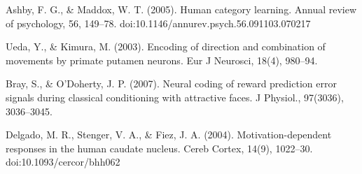 Ashby, F. G., & Maddox, W. T. (2005). Human category learning. Annual review of psychology, 56, 149–78. doi:10.1146/annurev.psych.56.091103.070217

Ueda, Y., & Kimura, M. (2003). Encoding of direction and combination of movements by primate putamen neurons. Eur J Neurosci, 18(4), 980–94.

Bray, S., & O'Doherty, J. P. (2007). Neural coding of reward prediction error signals during classical conditioning with attractive faces. J Physiol., 97(3036), 3036–3045.

Delgado, M. R., Stenger, V. A., & Fiez, J. A. (2004). Motivation-dependent responses in the human caudate nucleus. Cereb Cortex, 14(9), 1022–30. doi:10.1093/cercor/bhh062






